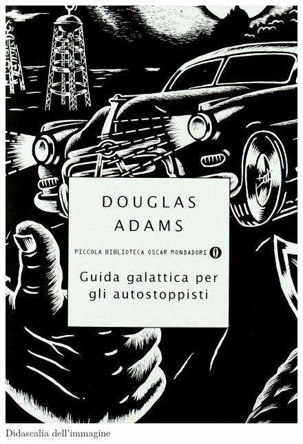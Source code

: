 \documentclass{article}
\begin{document}
    \begin{figure}
        \centering
        \includegraphics[scale=.3]{../img/immagine}
        \caption{Didascalia dell'immagine}
    \end{figure}
\end{document}

